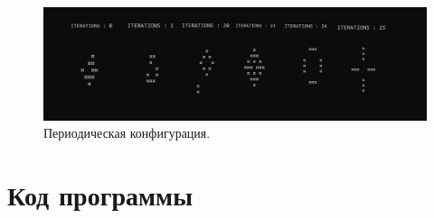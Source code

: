 \documentclass[14pt]{extarticle}
\begin{document}
\begin{figure}[!h]
  \centering
  \includegraphics[width=1\textwidth]{PERIOD.jpg}
  \caption{Периодическая конфигурация.}
\end{figure}


\hfill \break

\newpage
\section{Код программы}
\end{document}

